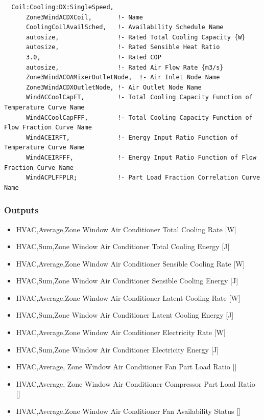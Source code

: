 \begin{lstlisting}
  Coil:Cooling:DX:SingleSpeed,
      Zone3WindACDXCoil,       !- Name
      CoolingCoilAvailSched,   !- Availability Schedule Name
      autosize,                !- Rated Total Cooling Capacity {W}
      autosize,                !- Rated Sensible Heat Ratio
      3.0,                     !- Rated COP
      autosize,                !- Rated Air Flow Rate {m3/s}
      Zone3WindACOAMixerOutletNode,  !- Air Inlet Node Name
      Zone3WindACDXOutletNode, !- Air Outlet Node Name
      WindACCoolCapFT,         !- Total Cooling Capacity Function of Temperature Curve Name
      WindACCoolCapFFF,        !- Total Cooling Capacity Function of Flow Fraction Curve Name
      WindACEIRFT,             !- Energy Input Ratio Function of Temperature Curve Name
      WindACEIRFFF,            !- Energy Input Ratio Function of Flow Fraction Curve Name
      WindACPLFFPLR;           !- Part Load Fraction Correlation Curve Name
\end{lstlisting}

\subsubsection{Outputs}\label{outputs-6-012}

\begin{itemize}
\item
  HVAC,Average,Zone Window Air Conditioner Total Cooling Rate {[}W{]}
\item
  HVAC,Sum,Zone Window Air Conditioner Total Cooling Energy {[}J{]}
\item
  HVAC,Average,Zone Window Air Conditioner Sensible Cooling Rate {[}W{]}
\item
  HVAC,Sum,Zone Window Air Conditioner Sensible Cooling Energy {[}J{]}
\item
  HVAC,Average,Zone Window Air Conditioner Latent Cooling Rate {[}W{]}
\item
  HVAC,Sum,Zone Window Air Conditioner Latent Cooling Energy {[}J{]}
\item
  HVAC,Average,Zone Window Air Conditioner Electricity Rate {[}W{]}
\item
  HVAC,Sum,Zone Window Air Conditioner Electricity Energy {[}J{]}
\item
  HVAC,Average, Zone Window Air Conditioner Fan Part Load Ratio {[]}
\item
  HVAC,Average, Zone Window Air Conditioner Compressor Part Load Ratio {[]}
\item
  HVAC,Average,Zone Window Air Conditioner Fan Availability Status {[]}
\end{itemize}

